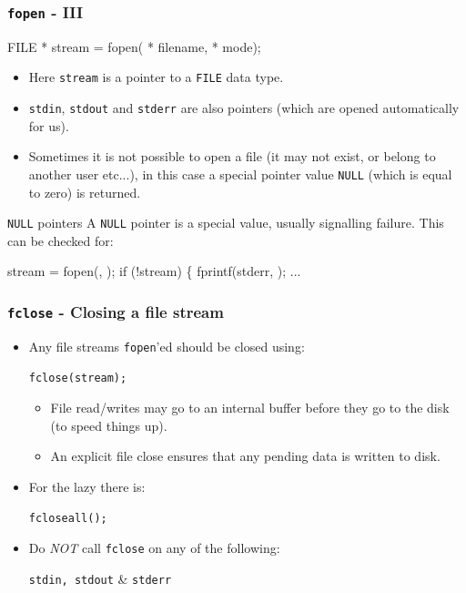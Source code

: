 \documentclass[smaller,table]{beamer}
\begin{document}
\begin{frame}[fragile]
\frametitle{{\tt fopen} - III}
\begin{semiverbatim}
\small
FILE * stream = fopen( * filename,  * mode);
\end{semiverbatim}
\vspace{-0.1in}
\begin{itemize}
\item Here {\tt stream} is a pointer to a {\tt FILE} data type.
\item {\tt stdin}, {\tt stdout} and {\tt stderr} are also pointers (which are opened automatically for us).
\item Sometimes it is not possible to open a file (it may not exist, or belong to another user etc...), in this case a special pointer value {\tt NULL} (which is equal to zero) is returned.
\end{itemize}

\begin{block}{{\tt NULL} pointers}
A {\tt NULL} pointer is a special value, usually signalling failure. This can be checked for:
\vspace{-0.2in}
\begin{semiverbatim}
\footnotesize
stream = fopen(, );
if (!stream)
\{
   fprintf(stderr, );
   ...
\end{semiverbatim}
\end{block}
\end{frame}

\begin{frame}
\frametitle{{\tt fclose} - Closing a file stream}
\begin{itemize}
\item Any file streams {\tt fopen}'ed should be closed using:
\begin{center}
\tt fclose(stream);
\end{center}
\begin{itemize}
\item File read/writes may go to an internal buffer before they go to the disk (to speed things up).
\item An explicit file close ensures that any pending data is written to disk.
\end{itemize}
\item For the lazy there is:
\begin{center}
\tt fcloseall();
\end{center}
\item Do \emph{NOT} call {\tt fclose} on any of the following:
\begin{center}
{\tt stdin, stdout} \& \tt stderr
\end{center}
\end{itemize}
\end{frame}
\end{document}
